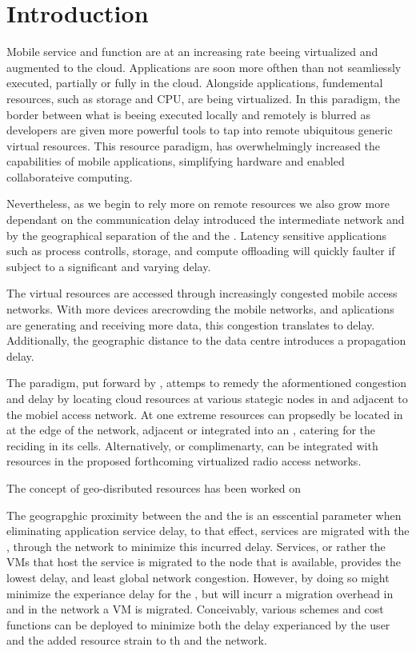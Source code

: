 \section{Introduction}
Mobile service and function are at an increasing rate beeing virtualized and augmented to the cloud. Applications are soon more ofthen than not seamliessly executed, partially or fully in the cloud. Alongside applications, fundemental \ue resources, such as storage and CPU, are being virtualized. In this paradigm, the border between what is beeing executed locally and remotely is blurred as developers are given more powerful tools to tap into remote ubiquitous generic virtual resources. This resource paradigm, has overwhelmingly increased the capabilities of mobile applications, simplifying hardware and enabled collaborateive computing. 

Nevertheless, as we begin to rely more on remote resources we also grow more dependant on the communication delay introduced the intermediate network and by the geographical separation of the \ue and the \dc. Latency sensitive applications such as process controlls, storage, and compute offloading will quickly faulter if subject to a significant and varying delay.

The virtual resources are accessed through increasingly congested mobile access networks. With more devices arecrowding the mobile networks, and aplications are generating and receiving more data, this congestion translates to delay. Additionally, the geographic distance to the data centre introduces a propagation delay.

The \xcloud paradigm, put forward by \cite{chandra2013decentralized,ericsson-akami}, attemps to remedy the aformentioned congestion and delay by locating cloud resources at various stategic nodes in and adjacent to the mobiel access network. At one extreme \dc resources can propsedly be located in at the edge of the network, adjacent or integrated into an \rbs, catering for the \ues reciding in its cells. Alternatively, or complimenarty, \dcs can be integrated with resources in the proposed forthcoming virtualized radio access networks.

The concept of geo-disributed resources has been worked on 

The geograpghic proximity between the \ue and the \dc is an esscential parameter when eliminating application service delay, to that effect, services are migrated with the \ue, through the network to minimize this incurred delay. Services, or rather the VMs that host the service is migrated to the node that is available, provides the lowest delay, and least global network congestion. However, by doing so might minimize the experiance delay for the \ue, but will incurr a migration overhead in \dc and in the network a VM is migrated. Conceivably, various schemes and cost functions can be deployed to minimize both the delay experianced by the user and the added resource strain to th \dc and the network.

